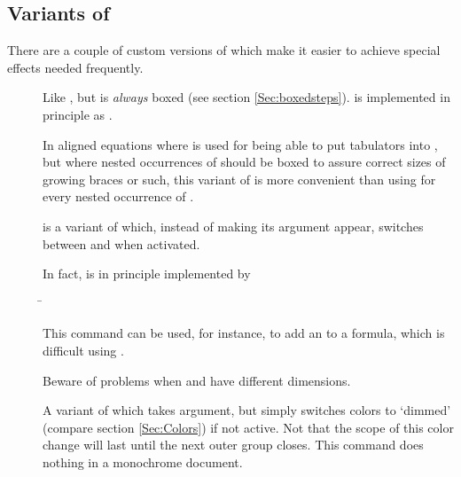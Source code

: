 \begin{slide}
  \newslide

  \subsection{Variants of }
  There are a couple of custom versions of  which make it easier to achieve special effects needed
  frequently.
  \begin{description}
  \item[]
    Like , but is \emph{always} boxed (see section
    \ref{Sec:boxedsteps}).  is
    implemented in principle as
    .

    In aligned equations where  is used for being able to put tabulators into ,
    but where nested occurrences of  should be boxed to assure correct sizes of growing braces or such,
    this variant of  is more convenient than using  for every nested occurrence
    of .

  \item[]
     is a variant of  which,
    instead of making its argument appear, switches between 
    and  when activated.

    In fact,  is in principle implemented by
    \begin{tabbing}
      \=\\
      \>
    \end{tabbing}

    This command can be used, for instance, to add an  to a formula, which is difficult using
    .

    Beware of problems when  and  have different dimensions.

    \newslide

  \item[]
    A variant of  which takes  argument, but simply
    switches colors to `dimmed' (compare section \ref{Sec:Colors}) if not
    active. Not that the scope of this color change will
    last until the next outer group closes. This command does nothing in a monochrome document.


\end{description}
\end{slide}
